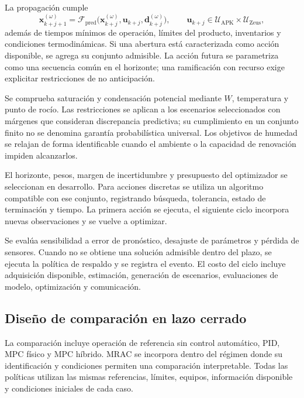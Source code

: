 La propagación cumple
\begin{equation}
\mathbf x_{k+j+1}^{(\omega)}
=\mathcal F_{\mathrm{pred}}
\bigl(\mathbf x_{k+j}^{(\omega)},
\mathbf u_{k+j},\mathbf d_{k+j}^{(\omega)}\bigr),
\qquad
\mathbf u_{k+j}\in
\mathcal U_{\mathrm{APK}}\times\mathcal U_{\mathrm{Zeus}},
\label{met:restricciones_mpc}
\end{equation}
además de tiempos mínimos de operación, límites del producto, inventarios y condiciones termodinámicas. Si una abertura está caracterizada como acción disponible, se agrega su conjunto admisible. La acción futura se parametriza como una secuencia común en el horizonte; una ramificación con recurso exige explicitar restricciones de no anticipación.

Se comprueba saturación y condensación potencial mediante $W$, temperatura y punto de rocío. Las restricciones se aplican a los escenarios seleccionados con márgenes que consideran discrepancia predictiva; su cumplimiento en un conjunto finito no se denomina garantía probabilística universal. Los objetivos de humedad se relajan de forma identificable cuando el ambiente o la capacidad de renovación impiden alcanzarlos.

El horizonte, pesos, margen de incertidumbre y presupuesto del optimizador se seleccionan en desarrollo. Para acciones discretas se utiliza un algoritmo compatible con ese conjunto, registrando búsqueda, tolerancia, estado de terminación y tiempo. La primera acción se ejecuta, el siguiente ciclo incorpora nuevas observaciones y se vuelve a optimizar.

Se evalúa sensibilidad a error de pronóstico, desajuste de parámetros y pérdida de sensores. Cuando no se obtiene una solución admisible dentro del plazo, se ejecuta la política de respaldo y se registra el evento. El costo del ciclo incluye adquisición disponible, estimación, generación de escenarios, evaluaciones de modelo, optimización y comunicación.

\subsection{Diseño de comparación en lazo cerrado}
\label{met:comparacion_control}

La comparación incluye operación de referencia sin control automático, PID, MPC físico y MPC híbrido. MRAC se incorpora dentro del régimen donde su identificación y condiciones permiten una comparación interpretable. Todas las políticas utilizan las mismas referencias, límites, equipos, información disponible y condiciones iniciales de cada caso.

